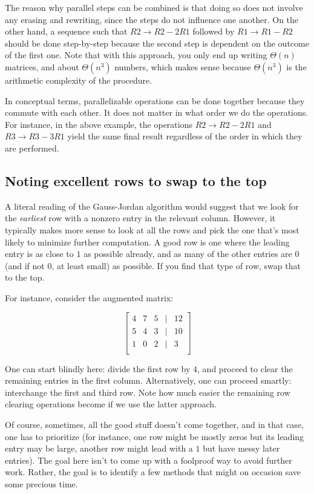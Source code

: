 \documentclass[10pt]{amsart}
\begin{document}
The reason why parallel steps can be combined is that doing so does
not involve any erasing and rewriting, since the steps do not
influence one another. On the other hand, a sequence such that $R2 \to
R2 - 2R1$ followed by $R1 \to R1 - R2$ should be done step-by-step
because the second step is dependent on the outcome of the first
one. Note that with this approach, you only end up writing $\Theta(n)$
matrices, and about $\Theta(n^3)$ numbers, which makes sense because
$\Theta(n^3)$ is the arithmetic complexity of the procedure.

In conceptual terms, parallelizable operations can be done together
because they commute with each other. It does not matter in what order
we do the operations. For instance, in the above example, the
operations $R2 \to R2 - 2R1$ and $R3 \to R3 - 3R1$ yield the same
final result regardless of the order in which they are performed.
\subsection{Noting excellent rows to swap to the top}

A literal reading of the Gauss-Jordan algorithm would suggest that we
look for the {\em earliest} row with a nonzero entry in the relevant
column. However, it typically makes more sense to look at all the rows
and pick the one that's most likely to minimize further computation. A
good row is one where the leading entry is as close to $1$ as possible
already, and as many of the other entries are $0$ (and if not $0$, at
least small) as possible. If you find that type of row, swap that to
the top.

For instance, consider the augmented matrix:

$$\left[\begin{matrix} 4 & 7 & 5 & \mid & 12 \\ 5 & 4 & 3 & \mid & 10 \\ 1 & 0 & 2 & \mid & 3 \\\end{matrix}\right]$$

One can start blindly here: divide the first row by $4$, and proceed
to clear the remaining entries in the first column. Alternatively, one
can proceed smartly: interchange the first and third row. Note how
much easier the remaining row clearing operations become if we use the
latter approach.

Of course, sometimes, all the good stuff doesn't come together, and in
that case, one has to prioritize (for instance, one row might be
mostly zeros but its leading entry may be large, another row might
lead with a $1$ but have messy later entries). The goal here isn't to
come up with a foolproof way to avoid further work. Rather, the goal
is to identify a few methods that might on occasion save some precious
time.
\end{document}
